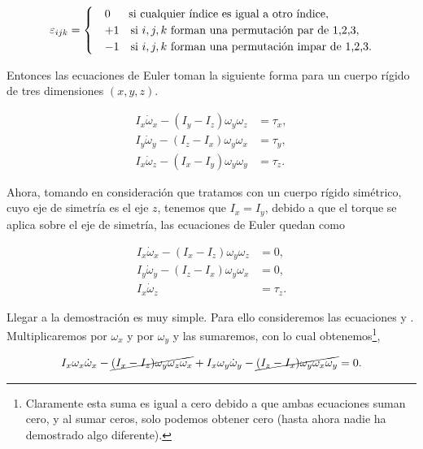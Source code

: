 \documentclass[a4paper,10pt]{article}
\numberwithin{equation}{section}
\begin{document}
\begin{align*}
 \varepsilon_{ijk} = \left\{\def\arraystretch{1.2}%
  \begin{array}{@{}c@{\quad}l@{}}
     &0 \quad \text{\hspace{.1cm} si cualquier índice es igual a otro índice}, \\
    &+1 \quad \text{si $i,j,k$ forman una permutación par de 1,2,3}, \\
    &-1 \quad \text{si $i,j,k$ forman una permutación impar de 1,2,3}.
  \end{array}\right.
\end{align*}

Entonces las ecuaciones de Euler toman la siguiente forma para un cuerpo rígido
de tres dimensiones $(x,y,z)$.

\begin{align}
 I_x \dot{\omega}_x - (I_y - I_z)\omega_y\omega_z &= \tau_x, \\
 I_y \dot{\omega}_y - (I_z - I_x)\omega_y\omega_x &= \tau_y, \\
 I_x \dot{\omega}_z - (I_x - I_y)\omega_y\omega_y &= \tau_z.
\end{align}

Ahora, tomando en consideración que tratamos con un cuerpo rígido simétrico, cuyo eje 
de simetría es el eje $z$, tenemos que $I_x = I_y$, debido a que el torque se aplica
sobre el eje de simetría, las ecuaciones de Euler quedan como

\begin{align}
\label{eq:rigid1}
 I_x \dot{\omega}_x - (I_x - I_z)\omega_y\omega_z &= 0, \\
\label{eq:rigid2}
 I_y \dot{\omega}_y - (I_z - I_x)\omega_y\omega_x &= 0, \\
 I_x \dot{\omega}_z &= \tau_z.
\end{align}

Llegar a la demostración es muy simple. Para ello consideremos las ecuaciones  
y . Multiplicaremos  por $\omega_x$ y  por
$\omega_y$ y las sumaremos, con lo cual obtenemos\footnote{Claramente esta suma es 
igual a cero debido a que ambas ecuaciones suman cero, y al sumar ceros, solo
podemos obtener cero (hasta ahora nadie ha demostrado algo diferente).},

\begin{equation}
 I_x \omega_x \dot{\omega}_x - \cancel{(I_x - I_z)\omega_y\omega_z\omega_x}  + 
 I_x \omega_y \dot{\omega}_y - \cancel{(I_z - I_x)\omega_y\omega_x\omega_y} = 0.
\end{equation}
\end{document}
